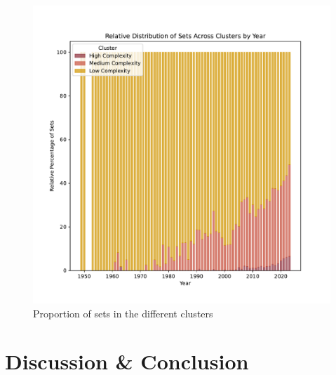 \documentclass{article}
\theoremstyle{plain}
\theoremstyle{definition}
\theoremstyle{remark}
\begin{document}
\begin{figure}[ht]
 \vskip 0.2in
 \begin{center}
 \centerline{\includegraphics[width=\columnwidth]{Images/Clusters.pdf}}
\caption{Proportion of sets in the different clusters}
\label{icml-historical}
 \end{center}
 \vskip -0.2in
\end{figure}

\section{Discussion \& Conclusion}\label{sec:conclusion}
\end{document}
